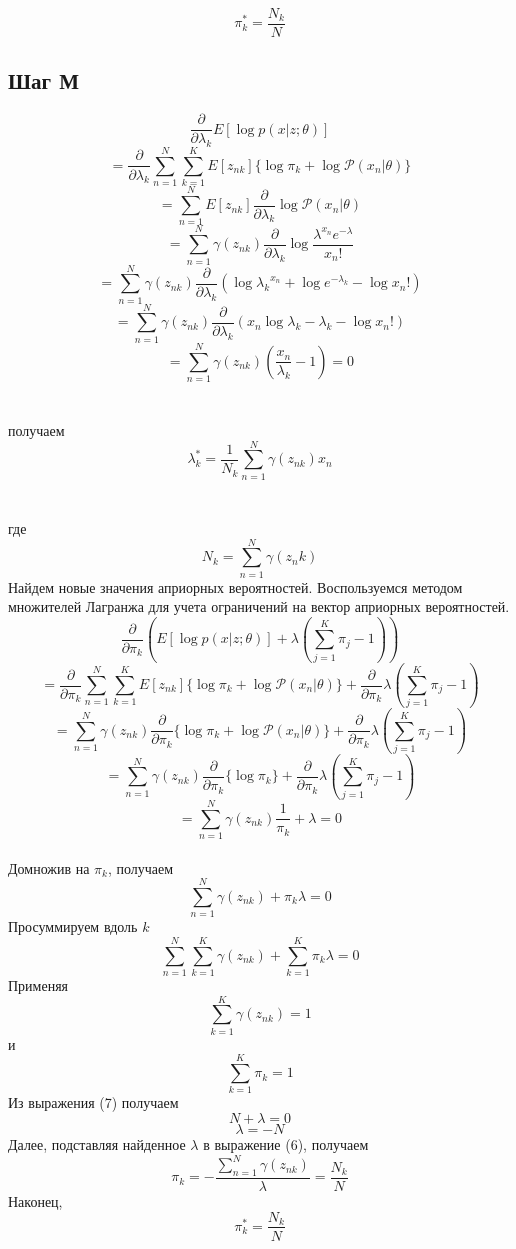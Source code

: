 \documentclass{matmex-diploma}
\begin{document}
\begin{equation}
\pi_{k}^* = \frac{N_k}{N}
\end{equation}

\subsection*{Шаг М}
$$\frac{\partial}{\partial \lambda_k}E[\log p(x|z;\theta)]$$
$$=\frac{\partial}{\partial \lambda_k}\sum_{n=1}^N \sum_{k=1}^K
E[z_{nk}]\{\log \pi_k + \log \mathcal{P}(x_n|\theta)\}$$
$$= \sum_{n=1}^N E[z_{nk}] \frac{\partial}{\partial \lambda_k} \log \mathcal{P}(x_n|\theta)$$
$$= \sum_{n=1}^N \gamma(z_{nk}) \frac{\partial}{\partial \lambda_k} \log {\frac{\lambda^{x_n} e^{-\lambda}}{x_n!}}$$
$$= \sum_{n=1}^N \gamma(z_{nk}) \frac{\partial}{\partial \lambda_k} (\log {\lambda_k}^{x_n} + \log e^{-\lambda_k} - \log x_n! )$$
$$= \sum_{n=1}^N \gamma(z_{nk}) \frac{\partial}{\partial \lambda_k} (x_n \log \lambda_k - \lambda_k - \log x_n! )$$
$$= \sum_{n=1}^N \gamma(z_{nk}) (\frac{x_n}{\lambda_k} - 1)= 0$$
\\\\
получаем
\begin{equation}
\lambda_k^* = \frac{1}{N_k}\sum_{n=1}^N\gamma(z_{nk})x_n
\end{equation}
\\\\
где
\begin{equation}
N_k = \sum_{n=1}^N\gamma(z_nk)
\end{equation}
Найдем новые значения априорных вероятностей.
Воспользуемся методом множителей Лагранжа для учета ограничений на вектор априорных вероятностей. 
$$\frac{\partial}{\partial \pi_k}( E[\log p(x|z;\theta)] + \lambda(\sum_{j=1}^K \pi_j - 1))$$
$$= \frac{\partial}{\partial \pi_k}\sum_{n=1}^N \sum_{k=1}^K
E[z_{nk}]\{\log \pi_k + \log \mathcal{P}(x_n|\theta)\} + \frac{\partial}{\partial \pi_k}\lambda(\sum_{j=1}^K \pi_j - 1)$$
$$ = \sum_{n=1}^N
\gamma(z_{nk})\frac{\partial}{\partial \pi_k}\{\log \pi_k + \log \mathcal{P}(x_n|\theta)\} + \frac{\partial}{\partial \pi_k} \lambda(\sum_{j=1}^K \pi_j - 1)$$
$$=\sum_{n=1}^N
\gamma(z_{nk})\frac{\partial}{\partial \pi_k}\{\log \pi_k\} + \frac{\partial}{\partial \pi_k} \lambda(\sum_{j=1}^K \pi_j - 1) $$
$$=\sum_{n=1}^N
\gamma(z_{nk})\frac{1}{\pi_k} + \lambda = 0$$
\\
Домножив на $\pi_k$, получаем
\begin{equation}
\sum_{n=1}^N \gamma(z_{nk}) + \pi_k \lambda = 0
\end{equation}
Просуммируем вдоль $k$
\begin{equation}
\sum_{n=1}^N \sum_{k=1}^K \gamma(z_{nk}) + \sum_{k=1}^K \pi_k \lambda = 0
\end{equation}
Применяя
$$\sum_{k=1}^K \gamma(z_{nk}) = 1$$
и
$$\sum_{k=1}^K \pi_k = 1$$
Из выражения (7) получаем
$$N + \lambda = 0$$
$$\lambda = -N$$
Далее, подставляя найденное $\lambda$ в выражение (6), получаем
$$\pi_k = - \frac{\sum_{n=1}^N\gamma(z_{nk})}{\lambda} = \frac{N_k}{N}$$
Наконец,
\begin{equation}
\pi_{k}^* = \frac{N_k}{N}
\end{equation}
\end{document}
